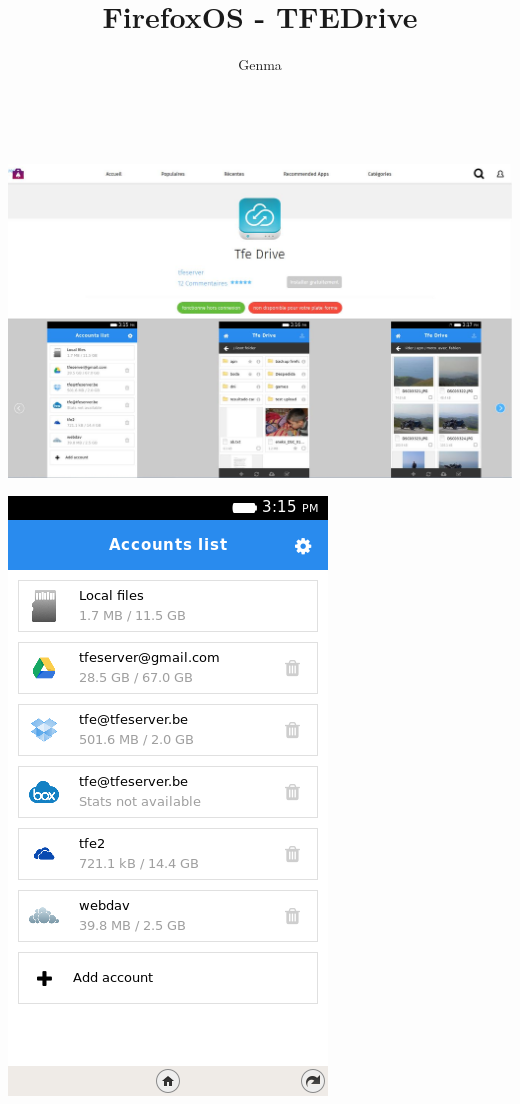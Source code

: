 \documentclass{beamer}
\title[FirefoxOS - TFEDrive]{FirefoxOS - TFEDrive}
\author{Genma}
\begin{document}
\begin{frame}
	\titlepage
	\vfill
	\begin{center}
		\\[2.5ex]
		{\tiny\CcNote{\CcLongnameByNcSa}}
		\vspace*{-2.5ex}
	\end{center}
\end{frame}

\begin{frame}
\includegraphics[scale=0.4] {./images/TFEDrive00.png} 
\end{frame}

\begin{frame}
\begin{center}
\includegraphics[scale=0.5] {./images/TFEDrive01.png} 
\end{center}
\end{frame}
\end{document}
